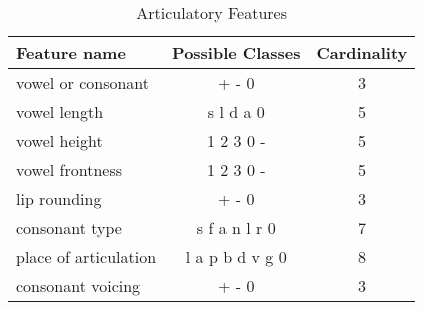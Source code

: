 \renewcommand{\arraystretch}{1.1}
\begin{table}[h]
\caption{Articulatory Features\label{tab:arti}}
\centering
\begin{tabular}{l | c | c}\toprule[\heavyrulewidth] \textbf{Feature name} & \textbf{Possible Classes} & \textbf{Cardinality} \\
\toprule[\heavyrulewidth]
vowel or consonant & + - 0 & 3 \\
vowel length & s l d a 0 & 5 \\
 vowel height & 1 2 3 0 - & 5 \\
vowel frontness & 1 2 3 0 - & 5\\
lip rounding & + - 0 & 3\\
consonant type & s f a n l r 0 &  7\\
 place of articulation & l a p b d v g 0 & 8\\
consonant voicing & + - 0 & 3\\
\bottomrule[\heavyrulewidth]
\end{tabular}
\label{arff}
\end{table}


